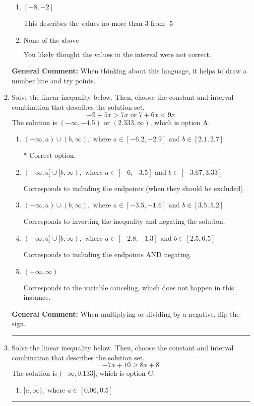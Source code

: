 \documentclass{extbook}[14pt]
\newcommand{\litem}[1]{\item #1

\rule{\textwidth}{0.4pt}}
\begin{document}
\begin{enumerate}
{\begin{enumerate}[label=\Alph*.]
This describes the values no less than 3 from -5
\item \( [-8, -2] \)

This describes the values no more than 3 from -5
\item \( \text{None of the above} \)

You likely thought the values in the interval were not correct.
\end{enumerate}

\textbf{General Comment:} When thinking about this language, it helps to draw a number line and try points.
}
\litem{
Solve the linear inequality below. Then, choose the constant and interval combination that describes the solution set.
\[ -9 + 5 x > 7 x \text{ or } 7 + 6 x < 9 x \]The solution is \( (-\infty, -4.5) \text{ or } (2.333, \infty) \), which is option A.\begin{enumerate}[label=\Alph*.]
\item \( (-\infty, a) \cup (b, \infty), \text{ where } a \in [-6.2, -2.9] \text{ and } b \in [2.1, 2.7] \)

 * Correct option.
\item \( (-\infty, a] \cup [b, \infty), \text{ where } a \in [-6, -3.5] \text{ and } b \in [-3.67, 3.33] \)

Corresponds to including the endpoints (when they should be excluded).
\item \( (-\infty, a) \cup (b, \infty), \text{ where } a \in [-3.5, -1.6] \text{ and } b \in [3.5, 5.2] \)

Corresponds to inverting the inequality and negating the solution.
\item \( (-\infty, a] \cup [b, \infty), \text{ where } a \in [-2.8, -1.3] \text{ and } b \in [2.5, 6.5] \)

Corresponds to including the endpoints AND negating.
\item \( (-\infty, \infty) \)

Corresponds to the variable canceling, which does not happen in this instance.
\end{enumerate}

\textbf{General Comment:} When multiplying or dividing by a negative, flip the sign.
}
\litem{
Solve the linear inequality below. Then, choose the constant and interval combination that describes the solution set.
\[ -7x + 10 \geq 8x + 8 \]The solution is \( (-\infty, 0.133] \), which is option C.\begin{enumerate}[label=\Alph*.]
\item \( [a, \infty), \text{ where } a \in [0.06, 0.5] \)


\end{enumerate}}
\end{enumerate}
\end{document}
